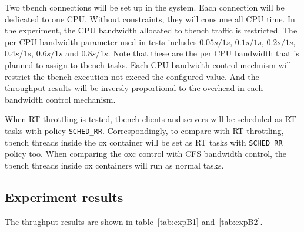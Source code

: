 Two tbench connections will be set up in the system.
Each connection will be dedicated to one CPU.
Without constraints, they will consume all CPU time.
In the experiment, the CPU bandwidth allocated to tbench traffic is restricted.
The per CPU bandwidth parameter used in tests includes
$0.05s/1s$, $0.1s/1s$, $0.2s/1s$, $0.4s/1s$, $0.6s/1s$ and 
$0.8s/1s$. 
Note that these are the per CPU bandwidth that is planned to assign to 
tbench tasks. Each CPU bandwidth control mechnism will restrict the 
tbench execution not exceed the configured value. And the throughput 
results will be inversly proportional to the overhead in each bandwidth 
control mechanism.

When RT throttling is tested, tbench clients and servers will be 
scheduled as RT tasks with policy \texttt{SCHED\_RR}. 
Correspondingly, to 
compare with RT throttling, tbench threads inside the ox container will 
be set as RT tasks with \texttt{SCHED\_RR} policy too. 
When comparing the oxc control with CFS bandwidth control, the tbench
threads inside ox containers will run as normal tasks. 

\subsection{Experiment results}

The thrughput results are shown in table~\ref{tab:expB1} and~\ref{tab:expB2}.

